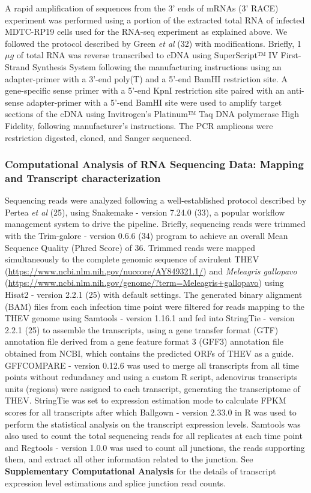 \documentclass[
]{article}
\begin{document}
A rapid amplification of sequences from the 3' ends of mRNAs (3' RACE)
experiment was performed using a portion of the extracted total RNA of
infected MDTC-RP19 cells used for the RNA-seq experiment as explained
above. We followed the protocol described by Green \emph{et al} (32)
with modifications. Briefly, 1\(\mu g\) of total RNA was reverse
transcribed to cDNA using SuperScript™ IV First-Strand Synthesis System
following the manufacturing instructions using an adapter-primer with a
3'-end poly(T) and a 5'-end BamHI restriction site. A gene-specific
sense primer with a 5'-end KpnI restriction site paired with an
anti-sense adapter-primer with a 5'-end BamHI site were used to amplify
target sections of the cDNA using Invitrogen's Platinum™ Taq DNA
polymerase High Fidelity, following manufacturer's instructions. The PCR
amplicons were restriction digested, cloned, and Sanger sequenced.

\subsubsection{Computational Analysis of RNA Sequencing Data: Mapping
and Transcript
characterization}\label{computational-analysis-of-rna-sequencing-data-mapping-and-transcript-characterization}

Sequencing reads were analyzed following a well-established protocol
described by Pertea \emph{et al} (25), using Snakemake - version 7.24.0
(33), a popular workflow management system to drive the pipeline.
Briefly, sequencing reads were trimmed with the Trim-galore - version
0.6.6 (34) program to achieve an overall Mean Sequence Quality (Phred
Score) of 36. Trimmed reads were mapped simultaneously to the complete
genomic sequence of avirulent THEV
(\url{https://www.ncbi.nlm.nih.gov/nuccore/AY849321.1/}) and
\emph{Meleagris gallopavo}
(\url{https://www.ncbi.nlm.nih.gov/genome/?term=Meleagris+gallopavo})
using Hisat2 - version 2.2.1 (25) with default settings. The generated
binary alignment (BAM) files from each infection time point were
filtered for reads mapping to the THEV genome using Samtools - version
1.16.1 and fed into StringTie - version 2.2.1 (25) to assemble the
transcripts, using a gene transfer format (GTF) annotation file derived
from a gene feature format 3 (GFF3) annotation file obtained from NCBI,
which contains the predicted ORFs of THEV as a guide. GFFCOMPARE -
version 0.12.6 was used to merge all transcripts from all time points
without redundancy and using a custom R script, adenovirus transcripts
units (regions) were assigned to each transcript, generating the
transcriptome of THEV. StringTie was set to expression estimation mode
to calculate FPKM scores for all transcripts after which Ballgown -
version 2.33.0 in R was used to perform the statistical analysis on the
transcript expression levels. Samtools was also used to count the total
sequencing reads for all replicates at each time point and Regtools -
version 1.0.0 was used to count all junctions, the reads supporting
them, and extract all other information related to the junction. See
\textbf{Supplementary Computational Analysis} for the details of
transcript expression level estimations and splice junction read counts.
\newpage
\end{document}
